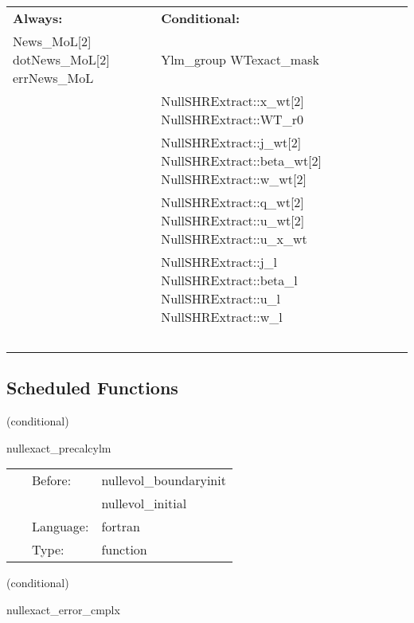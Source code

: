  \begin{tabular*}{160mm}{ll} 

{\bf Always:}& {\bf Conditional:} \\ 
 News\_MoL[2] dotNews\_MoL[2] errNews\_MoL &  Ylm\_group WTexact\_mask\\ 
~ &  NullSHRExtract::x\_wt[2] NullSHRExtract::WT\_r0\\ 
~ &  NullSHRExtract::j\_wt[2] NullSHRExtract::beta\_wt[2] NullSHRExtract::w\_wt[2]\\ 
~ &  NullSHRExtract::q\_wt[2] NullSHRExtract::u\_wt[2] NullSHRExtract::u\_x\_wt\\ 
~ &  NullSHRExtract::j\_l NullSHRExtract::beta\_l NullSHRExtract::u\_l NullSHRExtract::w\_l\\ 
~ & ~\\ 
\end{tabular*} 


\subsection*{Scheduled Functions}
\vspace{5mm}

   (conditional) 

\hspace{5mm} nullexact\_precalcylm 

\hspace{5mm}{\it precalculate spherical harmonics } 


\hspace{5mm}

 \begin{tabular*}{160mm}{cll} 
~ & Before:  & nullevol\_boundaryinit \\ 
~& ~ &nullevol\_initial\\ 
~ & Language:  & fortran \\ 
~ & Type:  & function \\ 
\end{tabular*} 


\vspace{5mm}

   (conditional) 

\hspace{5mm} nullexact\_error\_cmplx 

\hspace{5mm}{\it error in characteristic evolution variables } 


\hspace{5mm}

